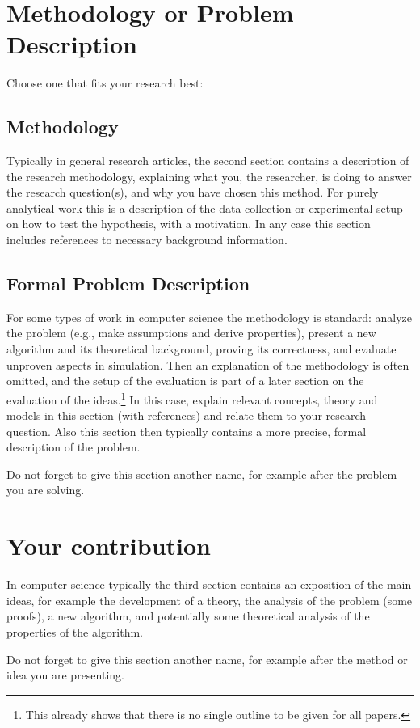 \documentclass[english]{article}
\begin{document}
\section{Methodology or Problem Description}
Choose one that fits your research best:
\subsection{Methodology}
Typically in general research articles, the second section contains a description of the research methodology, explaining what you, the researcher, is doing to answer the research question(s), and why you have chosen this method.
For purely analytical work this is a description of the data collection or experimental setup on how to test the hypothesis, with a motivation.
In any case this section includes references to necessary background information.

\subsection{Formal Problem Description}
For some types of work in computer science the methodology is standard: analyze the problem (e.g., make assumptions and derive properties), present a new algorithm and its theoretical background, proving its correctness, and evaluate unproven aspects in simulation.
Then an explanation of the methodology is often omitted, and the setup of the evaluation is part of a later section on the evaluation of the ideas.\footnote{This already shows that there is no single outline to be given for all papers.}
In this case, explain relevant concepts, theory and models in this section (with references) and relate them to your research question.
Also this section then typically contains a more precise, formal description of the problem.

Do not forget to give this section another name, for example after the problem you are solving.

\section{Your contribution}
In computer science typically the third section contains an exposition of the main ideas, for example the development of a theory, the analysis of the problem (some proofs), a new algorithm, and potentially some theoretical analysis of the properties of the algorithm.

Do not forget to give this section another name, for example after the method or idea you are presenting.
\end{document}
